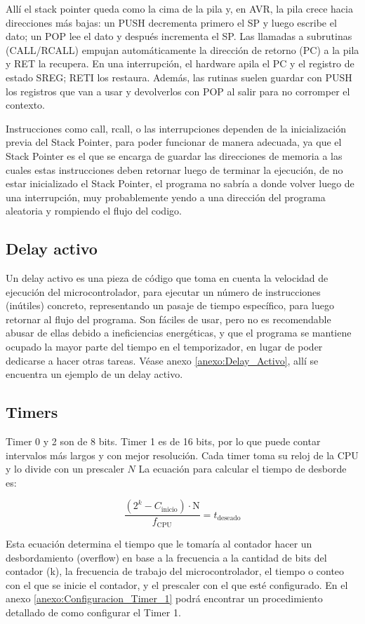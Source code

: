 Allí el stack pointer queda como la cima de la pila y, en AVR, la pila crece hacia direcciones más bajas: un PUSH decrementa primero el SP y luego escribe el dato; un POP lee el dato y después incrementa el SP. Las llamadas a subrutinas (CALL/RCALL) empujan automáticamente la dirección de retorno (PC) a la pila y RET la recupera. En una interrupción, el hardware apila el PC y el registro de estado SREG; RETI los restaura. Además, las rutinas suelen guardar con PUSH los registros que van a usar y devolverlos con POP al salir para no corromper el contexto.

Instrucciones como call, rcall, o las interrupciones dependen de la inicialización previa del Stack Pointer, para poder funcionar de manera adecuada, ya que el Stack Pointer es el que se encarga de guardar las direcciones de memoria a las cuales estas instrucciones deben retornar luego de terminar la ejecución, de no estar inicializado el Stack Pointer, el programa no sabría a donde volver luego de una interrupción, muy probablemente yendo a una dirección del programa aleatoria y rompiendo el flujo del codigo. 

\subsection{Delay activo}
Un delay activo es una pieza de código que toma en cuenta la velocidad de ejecución del microcontrolador, para ejecutar un número de instrucciones (inútiles) concreto, representando un pasaje de tiempo específico, para luego retornar al flujo del programa. Son fáciles de usar, pero no es recomendable abusar de ellas debido a ineficiencias energéticas, y que el programa se mantiene ocupado la mayor parte del tiempo en el temporizador, en lugar de poder dedicarse a hacer otras tareas. Véase anexo \ref{anexo:Delay_Activo}, allí se encuentra un ejemplo de un delay activo.

\subsection{Timers}
Timer 0 y 2 son de 8 bits. Timer 1 es de 16 bits, por lo que puede contar intervalos más largos y con mejor resolución. Cada timer toma su reloj de la CPU y lo divide con un prescaler \(N\) La ecuación para calcular el tiempo de desborde es:

\[
    \frac{(2^{k} - C_{\text{inicio}})\cdot \text{N}}{f_{\text{CPU}}} = t_{\text{deseado}}
\]


Esta ecuación determina el tiempo que le tomaría al contador hacer un desbordamiento (overflow) en base a la frecuencia a la cantidad de bits del contador (k), la frecuencia de trabajo del microcontrolador, el tiempo o conteo con el que se inicie el contador, y el prescaler con el que esté configurado. En el anexo \ref{anexo:Configuracion_Timer_1} podrá encontrar un procedimiento detallado de como configurar el Timer 1.

